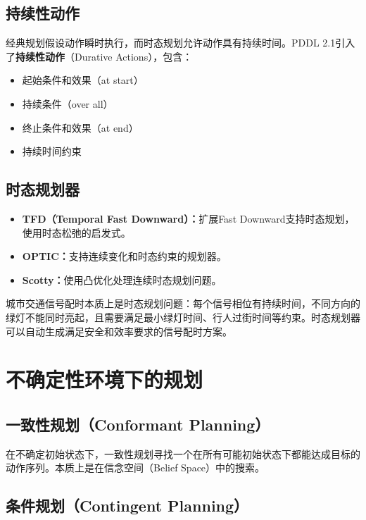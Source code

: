 \subsection{持续性动作}

经典规划假设动作瞬时执行，而时态规划允许动作具有持续时间。PDDL 2.1引入了\textbf{持续性动作}（Durative Actions），包含：
\begin{itemize}
  \item 起始条件和效果（at start）
  \item 持续条件（over all）
  \item 终止条件和效果（at end）
  \item 持续时间约束
\end{itemize}

\subsection{时态规划器}

\begin{itemize}
  \item \textbf{TFD（Temporal Fast Downward）：}扩展Fast Downward支持时态规划，使用时态松弛的启发式。
  \item \textbf{OPTIC：}支持连续变化和时态约束的规划器。
  \item \textbf{Scotty：}使用凸优化处理连续时态规划问题。
\end{itemize}

\begin{appbox}[title={\textbf{应用：交通信号配时}}]
城市交通信号配时本质上是时态规划问题：每个信号相位有持续时间，不同方向的绿灯不能同时亮起，且需要满足最小绿灯时间、行人过街时间等约束。时态规划器可以自动生成满足安全和效率要求的信号配时方案。
\end{appbox}

\section{不确定性环境下的规划 \grad}

\subsection{一致性规划（Conformant Planning）}

在不确定初始状态下，一致性规划寻找一个在所有可能初始状态下都能达成目标的动作序列。本质上是在信念空间（Belief Space）中的搜索。

\subsection{条件规划（Contingent Planning）}

